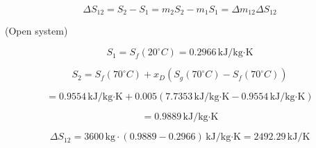 \[
\Delta S_{12} = S_2 - S_1 = m_2 S_2 - m_1 S_1 = \Delta m_{12} \Delta S_{12}
\]

(Open system)  

\[
S_1 = S_f (20^\circ C) = 0.2966 \, \text{kJ/kg·K}
\]

\[
S_2 = S_f (70^\circ C) + x_D \left( S_g (70^\circ C) - S_f (70^\circ C) \right)
\]

\[
= 0.9554 \, \text{kJ/kg·K} + 0.005 \left( 7.7353 \, \text{kJ/kg·K} - 0.9554 \, \text{kJ/kg·K} \right)
\]

\[
= 0.9889 \, \text{kJ/kg·K}
\]

\[
\Delta S_{12} = 3600 \, \text{kg} \cdot (0.9889 - 0.2966) \, \text{kJ/kg·K} = 2492.29 \, \text{kJ/K}
\]